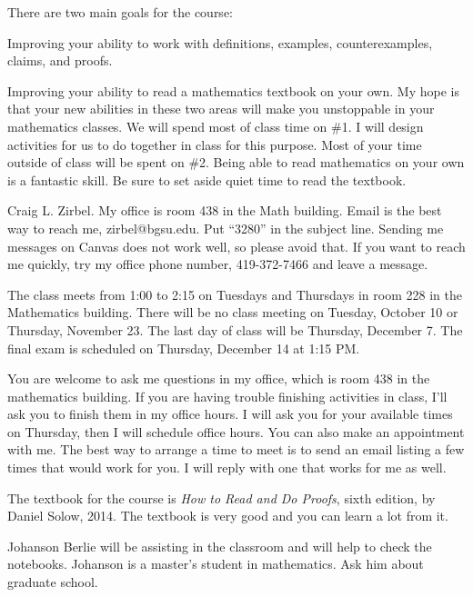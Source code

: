 \vspace*{-0.2in}

There are two main goals for the course:
\blist{0.0in}
\item Improving your ability to work with definitions, examples, counterexamples, claims, and proofs.
\item Improving your ability to read a mathematics textbook on your own.
\elist
My hope is that your new abilities in these two areas will make you unstoppable in your mathematics classes.
We will spend most of class time on \#1.  
I will design activities for us to do together in class for this purpose.
Most of your time outside of class will be spent on \#2.
Being able to read mathematics on your own is a fantastic skill.
Be sure to set aside quiet time to read the textbook.

Craig L. Zirbel.
My office is room 438 in the Math building.
Email is the best way to reach me, zirbel@bgsu.edu.
Put ``3280'' in the subject line.
Sending me messages on Canvas does not work well, so please avoid that.
If you want to reach me quickly, try my office phone number, 419-372-7466 and leave a message.

The class meets from 1:00 to 2:15 on Tuesdays and Thursdays in room 228 in the Mathematics building.
There will be no class meeting on Tuesday, October 10 or Thursday, November 23.
The last day of class will be Thursday, December 7.
The final exam is scheduled on Thursday, December 14 at 1:15 PM.

You are welcome to ask me questions in my office, which is room 438 in the mathematics building.
If you are having trouble finishing activities in class, I'll ask you to finish them in my office hours.
I will ask you for your available times on Thursday, then I will schedule office hours.
You can also make an appointment with me.
The best way to arrange a time to meet is to send an email listing a few times that would work for you.
I will reply with one that works for me as well.

The textbook for the course is {\em How to Read and Do Proofs}, sixth edition, by Daniel Solow, 2014.  
The textbook is very good and you can learn a lot from it.

 Johanson Berlie will be assisting in the classroom and will help to check the notebooks.
Johanson is a master's student in mathematics.
Ask him about graduate school.

